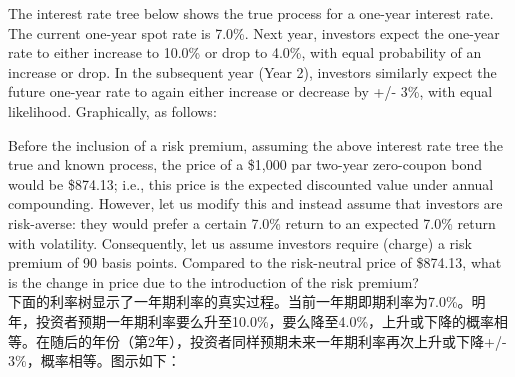 \documentclass{article}
\newcounter{question} %
\begin{document}
\begin{question}
    The interest rate tree below shows the true process for a one-year interest rate. The
    current one-year spot rate is 7.0\%. Next year, investors expect the one-year rate to either
    increase to 10.0\% or drop to 4.0\%, with equal probability of an increase or drop. In the
    subsequent year (Year 2), investors similarly expect the future one-year rate to again either
    increase or decrease by +/- 3\%, with equal likelihood. Graphically, as follows:




    Before the inclusion of a risk premium, assuming the above interest rate tree the true and
    known process, the price of a \$1,000 par two-year zero-coupon bond would be \$874.13; i.e., this
    price is the expected discounted value under annual compounding. However, let us modify this
    and instead assume that investors are risk-averse: they would prefer a certain 7.0\% return to
    an expected 7.0\% return with volatility. Consequently, let us assume investors require (charge)
    a risk premium of 90 basis points. Compared to the risk-neutral price of \$874.13, what is the
    change in price due to the introduction of the risk premium?
    \\    下面的利率树显示了一年期利率的真实过程。当前一年期即期利率为7.0\%。明年，投资者预期一年期利率要么升至10.0\%，要么降至4.0\%，上升或下降的概率相等。在随后的年份（第2年），投资者同样预期未来一年期利率再次上升或下降+/- 3\%，概率相等。图示如下：



\end{question}
\end{document}
